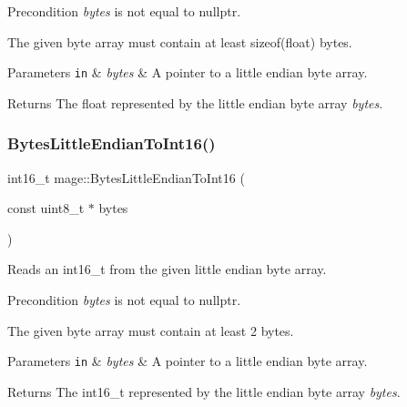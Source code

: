 \begin{DoxyPrecond}{Precondition}
{\itshape bytes} is not equal to {\ttfamily nullptr}. 

The given byte array must contain at least {\ttfamily sizeof(float)} bytes. 
\end{DoxyPrecond}

\begin{DoxyParams}[1]{Parameters}
\mbox{\tt in}  & {\em bytes} & A pointer to a little endian byte array. \\
\hline
\end{DoxyParams}
\begin{DoxyReturn}{Returns}
The {\ttfamily float} represented by the little endian byte array {\itshape bytes}. 
\end{DoxyReturn}
\hypertarget{namespacemage_ae5931c351f796a402fc353b2ae26767f}{}\label{namespacemage_ae5931c351f796a402fc353b2ae26767f} 
\subsubsection{\texorpdfstring{Bytes\+Little\+Endian\+To\+Int16()}{BytesLittleEndianToInt16()}}
{\footnotesize\ttfamily int16\+\_\+t mage\+::\+Bytes\+Little\+Endian\+To\+Int16 (\begin{DoxyParamCaption}\item[{const uint8\+\_\+t $\ast$}]{bytes }\end{DoxyParamCaption})\hspace{0.3cm}{\ttfamily [noexcept]}}

Reads an int16\+\_\+t from the given little endian byte array.

\begin{DoxyPrecond}{Precondition}
{\itshape bytes} is not equal to {\ttfamily nullptr}. 

The given byte array must contain at least 2 bytes. 
\end{DoxyPrecond}

\begin{DoxyParams}[1]{Parameters}
\mbox{\tt in}  & {\em bytes} & A pointer to a little endian byte array. \\
\hline
\end{DoxyParams}
\begin{DoxyReturn}{Returns}
The {\ttfamily int16\+\_\+t} represented by the little endian byte array {\itshape bytes}. 
\end{DoxyReturn}
\hypertarget{namespacemage_a5923645c90b3b1d327e768ed89d07922}{}\label{namespacemage_a5923645c90b3b1d327e768ed89d07922} 
